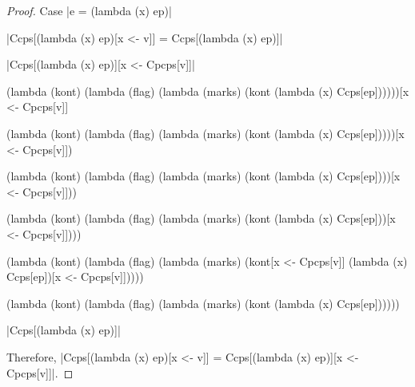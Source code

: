 \begin{proof}{Case \scheme|e = (lambda (x) ep)|}

\noindent
\scheme|Ccps[(lambda (x) ep)[x <- v]] = Ccps[(lambda (x) ep)]|

\noindent
\scheme|Ccps[(lambda (x) ep)][x <- Cpcps[v]]|

\begin{schemeblock}
\begin{schemedisplay}
(lambda (kont)
  (lambda (flag)
    (lambda (marks)
      (kont (lambda (x) Ccps[ep])))))[x <- Cpcps[v]]
\end{schemedisplay}
\end{schemeblock}

\begin{schemeblock}
\begin{schemedisplay}
(lambda (kont)
  (lambda (flag)
    (lambda (marks)
      (kont (lambda (x) Ccps[ep]))))[x <- Cpcps[v]])
\end{schemedisplay}
\end{schemeblock}

\begin{schemeblock}
\begin{schemedisplay}
(lambda (kont)
  (lambda (flag)
    (lambda (marks)
      (kont (lambda (x) Ccps[ep])))[x <- Cpcps[v]]))
\end{schemedisplay}
\end{schemeblock}

\begin{schemeblock}
\begin{schemedisplay}
(lambda (kont)
  (lambda (flag)
    (lambda (marks)
      (kont (lambda (x) Ccps[ep]))[x <- Cpcps[v]])))
\end{schemedisplay}
\end{schemeblock}

\begin{schemeblock}
\begin{schemedisplay}
(lambda (kont)
  (lambda (flag)
    (lambda (marks)
      (kont[x <- Cpcps[v]] (lambda (x) Ccps[ep])[x <- Cpcps[v]]))))
\end{schemedisplay}
\end{schemeblock}

\begin{schemeblock}
\begin{schemedisplay}
(lambda (kont)
  (lambda (flag)
    (lambda (marks)
      (kont (lambda (x) Ccps[ep])))))
\end{schemedisplay}
\end{schemeblock}

\noindent
\scheme|Ccps[(lambda (x) ep)]|

Therefore, \scheme|Ccps[(lambda (x) ep)[x <- v]] = Ccps[(lambda (x) ep)][x <- Cpcps[v]]|.
\end{proof}

